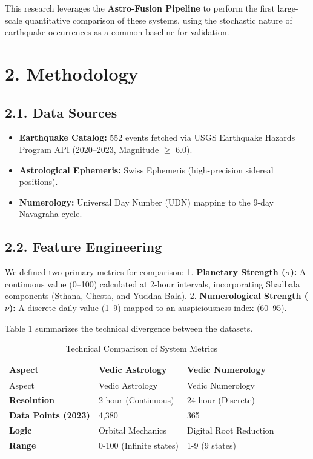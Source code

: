 \documentclass[
  american,
  11pt,
  oneside,
  openany]{scrbook}
\providecommand{\tightlist}{%
  \setlength{\itemsep}{0pt}\setlength{\parskip}{0pt}}
\begin{document}
This research leverages the \textbf{Astro-Fusion Pipeline} to perform
the first large-scale quantitative comparison of these systems, using
the stochastic nature of earthquake occurrences as a common baseline for
validation.

\chapter{2. Methodology}\label{methodology}

\section{2.1. Data Sources}\label{data-sources}

\begin{itemize}
\tightlist
\item
  \textbf{Earthquake Catalog:} 552 events fetched via USGS Earthquake
  Hazards Program API (2020--2023, Magnitude \(\ge\) 6.0).
\item
  \textbf{Astrological Ephemeris:} Swiss Ephemeris (high-precision
  sidereal positions).
\item
  \textbf{Numerology:} Universal Day Number (UDN) mapping to the 9-day
  Navagraha cycle.
\end{itemize}

\section{2.2. Feature Engineering}\label{feature-engineering}

We defined two primary metrics for comparison: 1. \textbf{Planetary
Strength (\(\sigma\)):} A continuous value (0--100) calculated at 2-hour
intervals, incorporating Shadbala components (Sthana, Chesta, and Yuddha
Bala). 2. \textbf{Numerological Strength (\(\nu\)):} A discrete daily
value (1--9) mapped to an auspiciousness index (60--95).

Table 1 summarizes the technical divergence between the datasets.

\begin{longtable}[]{@{}lll@{}}
\caption{Technical Comparison of System
Metrics}\label{tbl-specs}\tabularnewline
\toprule\noalign{}
Aspect & Vedic Astrology & Vedic Numerology \\
\midrule\noalign{}
\endfirsthead
\toprule\noalign{}
Aspect & Vedic Astrology & Vedic Numerology \\
\midrule\noalign{}
\endhead
\bottomrule\noalign{}
\endlastfoot
\textbf{Resolution} & 2-hour (Continuous) & 24-hour (Discrete) \\
\textbf{Data Points (2023)} & 4,380 & 365 \\
\textbf{Logic} & Orbital Mechanics & Digital Root Reduction \\
\textbf{Range} & 0-100 (Infinite states) & 1-9 (9 states) \\
\end{longtable}
\end{document}

